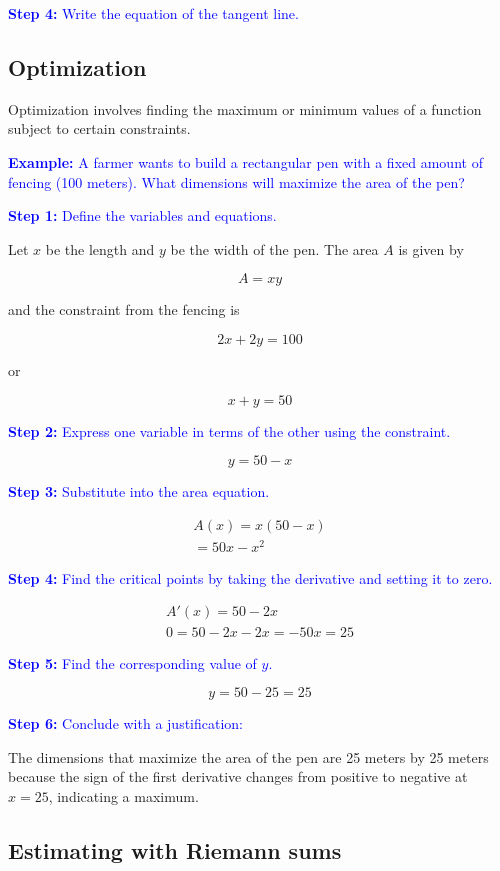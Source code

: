 \documentclass[letterpaper, 12pt]{article}
\newcommand{\example}[1]{\textcolor{blue}{\textbf{Example:} #1}}
\newcommand{\step}[2]{\textcolor{blue}{\textbf{Step #1:} #2}}
\begin{document}
\step{4}{Write the equation of the tangent line.}

\subsection*{Optimization}

Optimization involves finding the maximum or minimum values of a function subject to certain constraints.

\example{A farmer wants to build a rectangular pen with a fixed amount of fencing (100 meters). What dimensions will maximize the area of the pen?}

\step{1}{Define the variables and equations.}

Let $x$ be the length and $y$ be the width of the pen. The area $A$ is given by

$$ A = xy $$

and the constraint from the fencing is

$$ 2x + 2y = 100 $$

or

$$ x + y = 50 $$

\step{2}{Express one variable in terms of the other using the constraint.}

$$ y = 50 - x $$

\step{3}{Substitute into the area equation.}

\begin{gather*}
A(x) = x(50 - x) \\
= 50x - x^2
\end{gather*}

\step{4}{Find the critical points by taking the derivative and setting it to zero.}

\begin{gather*}
A'(x) = 50 - 2x \\
0 = 50 - 2x
-2x = -50
x = 25
\end{gather*}

\step{5}{Find the corresponding value of $y$.}

$$y = 50 - 25 = 25$$

\step{6}{Conclude with a justification:}

The dimensions that maximize the area of the pen are 25 meters by 25 meters because the sign of the first derivative changes from positive to negative at $x = 25$, indicating a maximum.

\subsection*{Estimating with Riemann sums}
\end{document}
